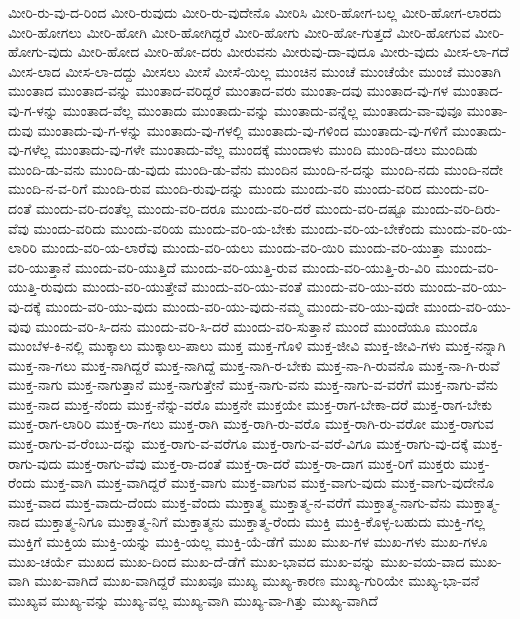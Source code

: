 {ಮೀರಿ-ರು-ವು-ದ-ರಿಂದ
ಮೀರಿ-ರುವುದು
ಮೀರಿ-ರು-ವುದೇನೊ
ಮೀರಿಸಿ
ಮೀರಿ-ಹೋಗ-ಬಲ್ಲ
ಮೀರಿ-ಹೋಗ-ಲಾರದು
ಮೀರಿ-ಹೋಗಲು
ಮೀರಿ-ಹೋಗಿ
ಮೀರಿ-ಹೋಗಿದ್ದರೆ
ಮೀರಿ-ಹೋಗು
ಮೀರಿ-ಹೋ-ಗುತ್ತದೆ
ಮೀರಿ-ಹೋಗುವ
ಮೀರಿ-ಹೋಗು-ವುದು
ಮೀರಿ-ಹೋದ
ಮೀರಿ-ಹೋ-ದರು
ಮೀರುವನು
ಮೀರುವು-ದಾ-ವುದೂ
ಮೀರು-ವುದು
ಮೀಸ-ಲಾ-ಗದೆ
ಮೀಸ-ಲಾದ
ಮೀಸ-ಲಾ-ದದ್ದು
ಮೀಸಲು
ಮೀಸೆ
ಮೀಸೆ-ಯಿಲ್ಲ
ಮುಂಚಿನ
ಮುಂಚೆ
ಮುಂಚೆಯೇ
ಮುಂಜೆ
ಮುಂತಾಗಿ
ಮುಂತಾದ
ಮುಂತಾದ-ವನ್ನು
ಮುಂತಾದ-ವರಿದ್ದರೆ
ಮುಂತಾದ-ವರು
ಮುಂತಾ-ದವು
ಮುಂತಾದ-ವು-ಗಳ
ಮುಂತಾದ-ವು-ಗ-ಳನ್ನು
ಮುಂತಾದ-ವೆಲ್ಲ
ಮುಂತಾದು
ಮುಂತಾದು-ವನ್ನು
ಮುಂತಾದು-ವನ್ನೆಲ್ಲ
ಮುಂತಾದು-ವಾ-ವುವೂ
ಮುಂತಾ-ದುವು
ಮುಂತಾದು-ವು-ಗ-ಳನ್ನು
ಮುಂತಾದು-ವು-ಗಳಲ್ಲಿ
ಮುಂತಾದು-ವು-ಗಳಿಂದ
ಮುಂತಾದು-ವು-ಗಳಿಗೆ
ಮುಂತಾದು-ವು-ಗಳೆಲ್ಲ
ಮುಂತಾದು-ವು-ಗಳೇ
ಮುಂತಾದು-ವೆಲ್ಲ
ಮುಂದಕ್ಕೆ
ಮುಂದಾಳು
ಮುಂದಿ
ಮುಂದಿ-ಡಲು
ಮುಂದಿಡು
ಮುಂದಿ-ಡು-ವನು
ಮುಂದಿ-ಡು-ವುದು
ಮುಂದಿ-ಡು-ವೆನು
ಮುಂದಿನ
ಮುಂದಿ-ನ-ದನ್ನು
ಮುಂದಿ-ನದು
ಮುಂದಿ-ನದೇ
ಮುಂದಿ-ನ-ವ-ರಿಗೆ
ಮುಂದಿ-ರುವ
ಮುಂದಿ-ರುವು-ದನ್ನು
ಮುಂದು
ಮುಂದು-ವರಿ
ಮುಂದು-ವರಿದ
ಮುಂದು-ವರಿ-ದಂತೆ
ಮುಂದು-ವರಿ-ದಂತೆಲ್ಲ
ಮುಂದು-ವರಿ-ದರೂ
ಮುಂದು-ವರಿ-ದರೆ
ಮುಂದು-ವರಿ-ದಷ್ಟೂ
ಮುಂದು-ವರಿ-ದಿರು-ವೆವು
ಮುಂದು-ವರಿದು
ಮುಂದು-ವರಿಯ
ಮುಂದು-ವರಿ-ಯ-ಬೇಕು
ಮುಂದು-ವರಿ-ಯ-ಬೇಕೆಂದು
ಮುಂದು-ವರಿ-ಯ-ಲಾರಿರಿ
ಮುಂದು-ವರಿ-ಯ-ಲಾರೆವು
ಮುಂದು-ವರಿ-ಯಲು
ಮುಂದು-ವರಿ-ಯಿರಿ
ಮುಂದು-ವರಿ-ಯುತ್ತಾ
ಮುಂದು-ವರಿ-ಯುತ್ತಾನೆ
ಮುಂದು-ವರಿ-ಯುತ್ತಿದೆ
ಮುಂದು-ವರಿ-ಯುತ್ತಿ-ರುವ
ಮುಂದು-ವರಿ-ಯುತ್ತಿ-ರು-ವಿರಿ
ಮುಂದು-ವರಿ-ಯುತ್ತಿ-ರುವುದು
ಮುಂದು-ವರಿ-ಯುತ್ತೇವೆ
ಮುಂದು-ವರಿ-ಯು-ವಂತೆ
ಮುಂದು-ವರಿ-ಯು-ವರು
ಮುಂದು-ವರಿ-ಯು-ವು-ದಕ್ಕೆ
ಮುಂದು-ವರಿ-ಯು-ವುದು
ಮುಂದು-ವರಿ-ಯು-ವುದು-ನಮ್ಮ
ಮುಂದು-ವರಿ-ಯು-ವುದೇ
ಮುಂದು-ವರಿ-ಯು-ವುವು
ಮುಂದು-ವರಿ-ಸಿ-ದನು
ಮುಂದು-ವರಿ-ಸಿ-ದರೆ
ಮುಂದು-ವರಿ-ಸುತ್ತಾನೆ
ಮುಂದೆ
ಮುಂದೆಯೂ
ಮುಂದೊ
ಮುಂಬೆಳ-ಕಿ-ನಲ್ಲಿ
ಮುಕ್ಕಾಲು
ಮುಕ್ಕಾಲು-ಪಾಲು
ಮುಕ್ತ
ಮುಕ್ತ-ಗೊಳಿ
ಮುಕ್ತ-ಜೀವಿ
ಮುಕ್ತ-ಜೀವಿ-ಗಳು
ಮುಕ್ತ-ನನ್ನಾಗಿ
ಮುಕ್ತ-ನಾ-ಗಲು
ಮುಕ್ತ-ನಾಗಿದ್ದರೆ
ಮುಕ್ತ-ನಾಗಿದ್ದೆ
ಮುಕ್ತ-ನಾಗಿ-ರ-ಬೇಕು
ಮುಕ್ತ-ನಾ-ಗಿ-ರುವನೊ
ಮುಕ್ತ-ನಾ-ಗಿ-ರುವೆ
ಮುಕ್ತ-ನಾಗು
ಮುಕ್ತ-ನಾಗುತ್ತಾನೆ
ಮುಕ್ತ-ನಾಗುತ್ತೇನೆ
ಮುಕ್ತ-ನಾಗು-ವನು
ಮುಕ್ತ-ನಾಗು-ವ-ವರೆಗೆ
ಮುಕ್ತ-ನಾಗು-ವೆನು
ಮುಕ್ತ-ನಾದ
ಮುಕ್ತ-ನೆಂದು
ಮುಕ್ತ-ನೆನ್ನು-ವರೊ
ಮುಕ್ತನೇ
ಮುಕ್ತಯೇ
ಮುಕ್ತ-ರಾಗ-ಬೇಕಾ-ದರೆ
ಮುಕ್ತ-ರಾಗ-ಬೇಕು
ಮುಕ್ತ-ರಾಗ-ಲಾರಿರಿ
ಮುಕ್ತ-ರಾ-ಗಲು
ಮುಕ್ತ-ರಾಗಿ
ಮುಕ್ತ-ರಾಗಿ-ರು-ವರೊ
ಮುಕ್ತ-ರಾಗಿ-ರು-ವರೋ
ಮುಕ್ತ-ರಾಗುವ
ಮುಕ್ತ-ರಾಗು-ವ-ರೆಂಬು-ದನ್ನು
ಮುಕ್ತ-ರಾಗು-ವ-ವರೆಗೂ
ಮುಕ್ತ-ರಾಗು-ವ-ವರೆ-ವಿಗೂ
ಮುಕ್ತ-ರಾಗು-ವು-ದಕ್ಕೆ
ಮುಕ್ತ-ರಾಗು-ವುದು
ಮುಕ್ತ-ರಾಗು-ವೆವು
ಮುಕ್ತ-ರಾ-ದಂತೆ
ಮುಕ್ತ-ರಾ-ದರೆ
ಮುಕ್ತ-ರಾ-ದಾಗ
ಮುಕ್ತ-ರಿಗೆ
ಮುಕ್ತರು
ಮುಕ್ತ-ರೆಂದು
ಮುಕ್ತ-ವಾಗಿ
ಮುಕ್ತ-ವಾಗಿದ್ದರೆ
ಮುಕ್ತ-ವಾಗು
ಮುಕ್ತ-ವಾಗುವ
ಮುಕ್ತ-ವಾಗು-ವುದು
ಮುಕ್ತ-ವಾಗು-ವುದೇನೊ
ಮುಕ್ತ-ವಾದ
ಮುಕ್ತ-ವಾದು-ದೆಂದು
ಮುಕ್ತ-ವೆಂದು
ಮುಕ್ತಾತ್ಮ
ಮುಕ್ತಾತ್ಮ-ನ-ವರೆಗೆ
ಮುಕ್ತಾತ್ಮ-ನಾಗು-ವೆನು
ಮುಕ್ತಾತ್ಮ-ನಾದ
ಮುಕ್ತಾತ್ಮ-ನಿಗೂ
ಮುಕ್ತಾತ್ಮ-ನಿಗೆ
ಮುಕ್ತಾತ್ಮನು
ಮುಕ್ತಾತ್ಮ-ರೆಂದು
ಮುಕ್ತಿ
ಮುಕ್ತಿ-ಕೊಳ್ಳ-ಬಹುದು
ಮುಕ್ತಿ-ಗಲ್ಲ
ಮುಕ್ತಿಗೆ
ಮುಕ್ತಿಯ
ಮುಕ್ತಿ-ಯನ್ನು
ಮುಕ್ತಿ-ಯಲ್ಲ
ಮುಕ್ತಿ-ಯೆ-ಡೆಗೆ
ಮುಖ
ಮುಖ-ಗಳ
ಮುಖ-ಗಳು
ಮುಖ-ಗಳೂ
ಮುಖ-ಚರ್ಯೆ
ಮುಖದ
ಮುಖ-ದಿಂದ
ಮುಖ-ದೆ-ಡೆಗೆ
ಮುಖ-ಭಾವದ
ಮುಖ-ವನ್ನು
ಮುಖ-ವಯ-ವಾದ
ಮುಖ-ವಾಗಿ
ಮುಖ-ವಾಗಿದೆ
ಮುಖ-ವಾಗಿದ್ದರೆ
ಮುಖವೂ
ಮುಖ್ಯ
ಮುಖ್ಯ-ಕಾರಣ
ಮುಖ್ಯ-ಗುರಿಯೇ
ಮುಖ್ಯ-ಭಾ-ವನೆ
ಮುಖ್ಯವ
ಮುಖ್ಯ-ವನ್ನು
ಮುಖ್ಯ-ವಲ್ಲ
ಮುಖ್ಯ-ವಾಗಿ
ಮುಖ್ಯ-ವಾ-ಗಿತ್ತು
ಮುಖ್ಯ-ವಾಗಿದೆ
}
